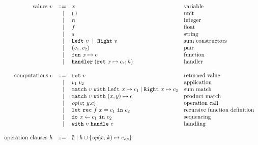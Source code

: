 
\[
	\begin{array}{rrll}
		\text{values}~v
		 & ::=   & x                      & \text{variable}          \\
		 & \vsep & \unit									& \text{unit}							 \\
		 & \vsep & n											& \text{integer}					 \\
		 & \vsep & f											& \text{float}						 \\
		 & \vsep & s											& \text{string}						 \\
		 & \vsep & \inleft{v}~\vsep~\inright{v} & \text{sum constructors} \\
		 & \vsep & \pair{v_1}{v_2}				&	\text{pair}						 	 \\
		 & \vsep & \fun{x}{c}             & \text{function}          \\
		 & \vsep & \handler{\hcases}      & \text{handler}           \\
		 \\
		 \text{computations}~c
		 & ::=   & \return{v}             & \text{returned value}    \\
		 & \vsep & \apply{v_1}{v_2}       & \text{application}       \\
		 & \vsep & \match{v} \inleft{x} \mapsto c_1 \vsep \inright{x} \mapsto c_2 & \text{sum match} \\
		 & \vsep & \match{v} \pair{x}{y} \mapsto c & \text{product match} \\
		 & \vsep & \operation{v}{y.c}     & \text{operation call}    \\
		 & \vsep & \letrec{f}{x}{c_1} {c_2}		& \text{recursive function definition} \\
		 & \vsep & \dobind{x}{c_1}{c_2}   & \text{sequencing}        \\
		 & \vsep & \withhandle{v}{c}      & \text{handling}					 \\
		 \\
		 \text{operation clauses}~\hcases
		  & ::=   & \emptyhcases \vsep \hcases \union \set{\operation{x}{k} \mapsto c_{\op}}                            \\
		\end{array}
		\]
